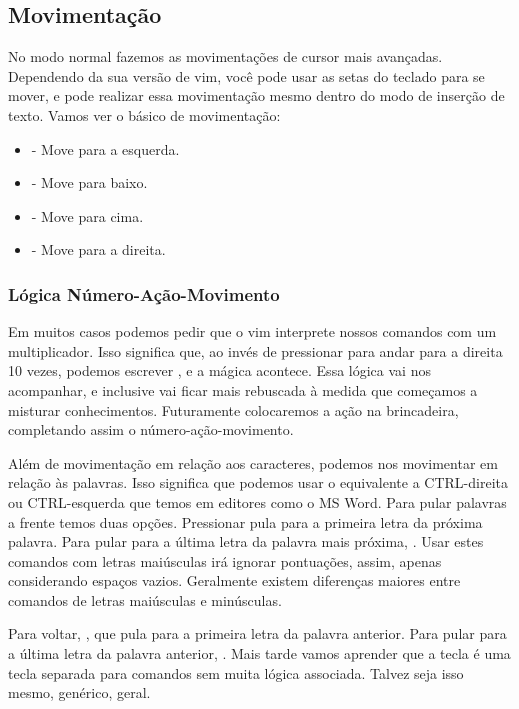 \documentclass[a4paper, 12pt]{article}
\begin{document}
\subsection{Movimentação}
No modo normal fazemos as movimentações de cursor mais avançadas.
Dependendo da sua versão de vim, você pode usar as setas do teclado para se mover, e pode realizar essa movimentação mesmo dentro do modo de inserção de texto.
Vamos ver o básico de movimentação:
\begin{itemize}
    \item {} - Move para a esquerda.
    \item {} - Move para baixo.
    \item {} - Move para cima.
    \item {} - Move para a direita.
\end{itemize}
\subsubsection{Lógica Número-Ação-Movimento}
Em muitos casos podemos pedir que o vim interprete nossos comandos com um multiplicador.
Isso significa que, ao invés de pressionar  para andar para a direita 10 vezes,
podemos escrever , e a mágica acontece.
Essa lógica vai nos acompanhar, e inclusive vai ficar mais rebuscada à medida que começamos a misturar conhecimentos.
Futuramente colocaremos a ação na brincadeira, completando assim o número-ação-movimento.


Além de movimentação em relação aos caracteres, podemos nos movimentar em relação às palavras.
Isso significa que podemos usar o equivalente a CTRL-direita ou CTRL-esquerda que temos em editores como o MS Word.
Para pular palavras a frente temos duas opções.
Pressionar  pula para a primeira letra da próxima palavra.
Para pular para a última letra da palavra mais próxima, .
Usar estes comandos com letras maiúsculas irá ignorar pontuações, assim, apenas considerando espaços vazios.
Geralmente existem diferenças maiores entre comandos de letras maiúsculas e minúsculas.

Para voltar, , que pula para a primeira letra da palavra anterior.
Para pular para a última letra da palavra anterior, .
Mais tarde vamos aprender que a tecla  é uma tecla separada para comandos sem muita lógica associada.
Talvez seja isso mesmo, genérico, geral.
\end{document}
